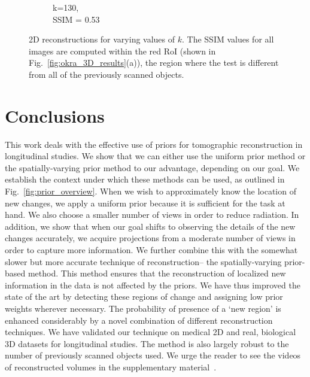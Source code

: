 \documentclass[journal]{IEEEtran}
\begin{document}
\begin{figure}[h]
\begin{subfigure}[b]{0.24\linewidth}
        \caption{k=130,\\ SSIM = 0.53}
     \end{subfigure}
    \caption{2D reconstructions for varying values of $k$. The SSIM values for all images are computed within the red RoI (shown in Fig.~\ref{fig:okra_3D_results}(a)), the region where the test is different from all of the previously scanned objects.}
\label{fig:reconstructions_as_k_varies}
\end{figure}


\section{Conclusions}
\label{sec:conclusions}
This work deals with the effective use of priors for tomographic
reconstruction in longitudinal studies. We show that we can either use
the uniform prior method or the spatially-varying prior method to our
advantage, depending on our goal. We establish the context under which
these methods can be used, as outlined in
Fig.~\ref{fig:prior_overview}. When we wish to approximately know the
location of new changes, we apply a uniform prior because it is
sufficient for the task at hand. We also choose a smaller number
of views in order to reduce radiation. In addition, we show that when
our goal shifts to observing the details of the new changes
accurately, we acquire projections from a moderate number of views in
order to capture more information. We further combine this with the
somewhat slower but more accurate technique of reconstruction-- the
spatially-varying prior-based method. This method ensures that the
reconstruction of localized new information in the data is not
affected by the priors. %
We have thus
improved the state of the art by detecting these regions of change and
assigning low prior weights wherever necessary. The probability of
presence of a `new region' is enhanced considerably by a novel
combination of different reconstruction techniques.  We have validated
our technique on medical 2D and real, biological 3D datasets for
longitudinal studies. The method is also largely robust to the number
of previously scanned objects used. We urge the reader to see the
videos of reconstructed volumes in the supplementary
material~\cite{supp_paper}.
\end{document}

